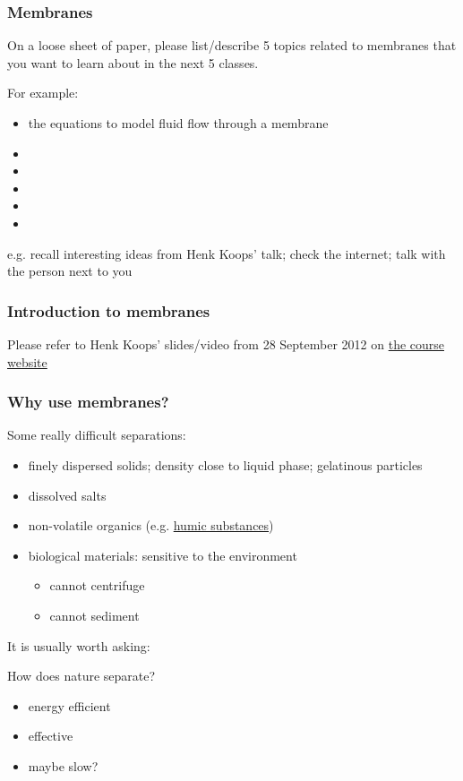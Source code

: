 \begin{frame}\frametitle{Membranes}
	On a loose sheet of paper, please list/describe 5 topics related to membranes that you want to learn about in the next 5 classes.
	
	\vspace{12pt}
	For example:
	\begin{itemize}
		\item	the equations to model fluid flow through a membrane
		\item	
		\item	
		\item	
		\item	
		\item	
	\end{itemize}
	
	\vspace{12pt}
	e.g. recall interesting ideas from Henk Koops' talk; check the internet; talk with the person next to you
\end{frame}

\begin{frame}\frametitle{Introduction to membranes}
	Please refer to Henk Koops' slides/video from 28 September 2012 on \href{http://learnche.mcmaster.ca/4M3/Membranes,_dialysis,_reverse_osmosis,_filters_and_bioseparations_-_2012}{the course website}
\end{frame}

\begin{frame}\frametitle{Why use membranes?}
	Some really difficult separations:
	\begin{itemize}
		\item	finely dispersed solids; density close to liquid phase; gelatinous particles
		\item	dissolved salts
		\item	non-volatile organics (e.g. \href{http://en.wikipedia.org/wiki/Humic_acid}{humic substances})
		\item	biological materials: sensitive to the environment
			\begin{itemize}
				\item	cannot centrifuge 
				\item	cannot sediment
			\end{itemize}
	\end{itemize}
	
	\vspace{12pt}
	\begin{exampleblock}{It is usually worth asking:}
		\begin{center}
			How does nature separate?
		\end{center}
		\scriptsize
		\begin{itemize}
			\item	energy efficient
			\item	effective
			\item	maybe slow?
		\end{itemize}
	\end{exampleblock}		
\end{frame}

